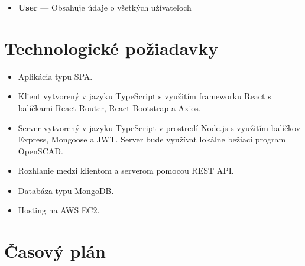 \documentclass[a4paper]{article}
\begin{document}
\begin{itemize}
    \item \textbf{User} ---
        Obsahuje údaje o všetkých užívateľoch
\end{itemize}


\section{Technologické požiadavky}

\begin{itemize}

\item
Aplikácia typu SPA.

\item
Klient vytvorený v jazyku TypeScript
s využitím frameworku React s balíčkami React Router, React Bootstrap a Axios.


\item
Server vytvorený v jazyku TypeScript
v prostredí Node.js
s využitím balíčkov Express, Mongoose a JWT.
Server bude využívať lokálne bežiaci program OpenSCAD.

\item
Rozhlanie medzi klientom a serverom pomocou REST API.

\item
Databáza typu MongoDB.

\item
Hosting na AWS EC2.

\end{itemize}


\section{Časový plán}
\end{document}
